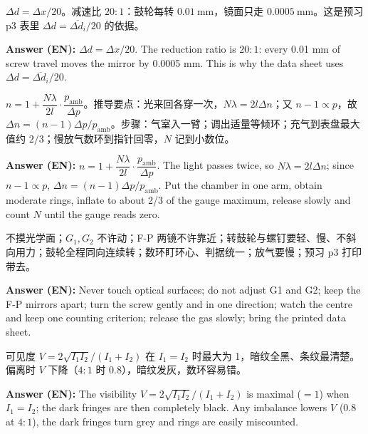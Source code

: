 \documentclass[11pt]{ctexart}
\begin{document}

\(\Delta d=\Delta x/20\)。减速比 \(20:1\)：鼓轮每转 \(0.01\ \mathrm{mm}\)，镜面只走 \(0.0005\ \mathrm{mm}\)。这是预习 p3 表里 \(\Delta d=\overline{\Delta d_i}/20\) 的依据。

\textbf{Answer (EN):} $\Delta d=\Delta x/20$. The reduction ratio is $20:1$: every 0.01 mm of screw travel moves the mirror by 0.0005 mm. This is why the data sheet uses $\Delta d=\overline{\Delta d_i}/20$.


\(n=1+\dfrac{N\lambda}{2l}\cdot\dfrac{p_{\mathrm{amb}}}{\Delta p}\)。推导要点：光来回各穿一次，\(N\lambda=2l\Delta n\)；又 \(n-1\propto p\)，故 \(\Delta n=(n-1)\Delta p/p_{\mathrm{amb}}\)。步骤：气室入一臂；调出适量等倾环；充气到表盘最大值约 \(2/3\)；慢放气数环到指针回零，\(N\) 记到小数位。

\textbf{Answer (EN):} $n=1+\dfrac{N\lambda}{2l}\cdot\dfrac{p_{\mathrm{amb}}}{\Delta p}$. The light passes twice, so $N\lambda=2l\Delta n$; since $n-1\propto p$, $\Delta n=(n-1)\Delta p/p_{\mathrm{amb}}$. Put the chamber in one arm, obtain moderate rings, inflate to about 2/3 of the gauge maximum, release slowly and count $N$ until the gauge reads zero.


不摸光学面；\(G_1,G_2\) 不许动；F-P 两镜不许靠近；转鼓轮与螺钉要轻、慢、不斜向用力；鼓轮全程同向连续转；数环盯环心、判据统一；放气要慢；预习 p3 打印带去。

\textbf{Answer (EN):} Never touch optical surfaces; do not adjust G1 and G2; keep the F-P mirrors apart; turn the screw gently and in one direction; watch the centre and keep one counting criterion; release the gas slowly; bring the printed data sheet.


可见度 \(V=2\sqrt{I_1I_2}/(I_1+I_2)\) 在 \(I_1=I_2\) 时最大为 1，暗纹全黑、条纹最清楚。偏离时 \(V\) 下降（\(4:1\) 时 \(0.8\)），暗纹发灰，数环容易错。

\textbf{Answer (EN):} The visibility $V=2\sqrt{I_1I_2}/(I_1+I_2)$ is maximal ($=1$) when $I_1=I_2$; the dark fringes are then completely black. Any imbalance lowers $V$ ($0.8$ at $4:1$), the dark fringes turn grey and rings are easily miscounted.

\end{document}
